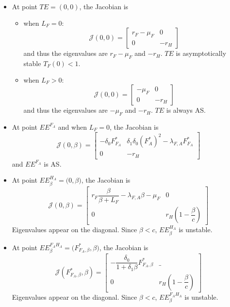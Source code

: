 \documentclass{article}
\newcommand{\lfa}{\lambda_{F, A}}
\begin{document}
\begin{itemize}
\item At point $TE = (0, 0)$, the Jacobian is
\begin{itemize}
\item when $L_F = 0$:
\begin{equation}
\mathcal{J}(0,0) = \begin{bmatrix}
r_F-\mu_F & 0 \\
0 & -r_H
\end{bmatrix}
\end{equation}
and thus the eigenvalues are $r_F-\mu_F$ and $-r_H$. $TE$ is asymptotically stable $T_F(0) < 1$.
\item when $L_F >0$:
\begin{equation}
\mathcal{J}(0,0) = \begin{bmatrix}
-\mu_F & 0 \\
0 & -r_H
\end{bmatrix}
\end{equation}
and thus the eigenvalues are $-\mu_F$ and $-r_H$. $TE$ is always AS.
\end{itemize}

\item At point $EE^{F_A}$ and when $L_F = 0$, the Jacobian is
\begin{equation}
\mathcal{J}(0, \beta) = \begin{bmatrix}
-\delta_0 F_{F_A}^* &  \delta_1 \delta_0 (F_A^*)^2- \lfa F^*_{F_A}\\
0 & -r_H
\end{bmatrix}
\end{equation}
and $EE^{F_A}$ is AS.

\item At point $EE^{H_A}_\beta = \Big(0,\beta \Big)$, the Jacobian is
\begin{equation}
\mathcal{J}(0, \beta) = \begin{bmatrix}
r_F\dfrac{\beta}{\beta+L_F} - \lfa \beta - \mu_F & 0 \\
0 & r_H (1 - \dfrac{\beta}{c})
\end{bmatrix}
\end{equation}
Eigenvalues appear on the diagonal. Since $\beta < c$, $EE^{H_A}_\beta$ is unstable.

\item At point $EE^{F_AH_A}_\beta = \Big(F^*_{F_A,\beta},\beta \Big)$, the Jacobian is
\begin{equation}
\mathcal{J}(F^*_{F_A,\beta}, \beta) = \begin{bmatrix}
- \dfrac{\delta_0}{1 + \delta_1 \beta} F^*_{F_A,\beta} & \_ \\
0 & r_H (1 - \dfrac{\beta}{c})
\end{bmatrix}
\end{equation}
Eigenvalues appear on the diagonal. Since $\beta < c$, $EE^{F_AH_A}_\beta$ is unstable.



\end{itemize}
\end{document}
